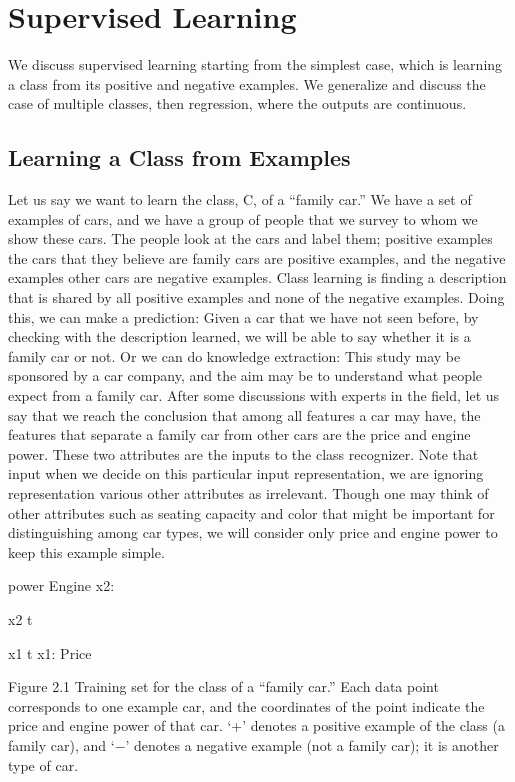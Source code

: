 \chapter{Supervised Learning}
\label{chap:02-supervised-learning}

We discuss supervised learning starting from the simplest case, which is learning a class from its positive and negative examples. We generalize and discuss the case of multiple classes, then regression, where the outputs are continuous.

\section{Learning a Class from Examples}

Let us say we want to learn the class, C, of a “family car.” We have a set of examples of cars, and we have a group of people that we survey to whom we show these cars. The people look at the cars and label them; positive examples the cars that they believe are family cars are positive examples, and the negative examples other cars are negative examples. Class learning is finding a description that is shared by all positive examples and none of the negative examples. Doing this, we can make a prediction: Given a car that we have not seen before, by checking with the description learned, we will be able to say whether it is a family car or not. Or we can do knowledge extraction: This study may be sponsored by a car company, and the aim may be to understand what people expect from a family car. After some discussions with experts in the field, let us say that we reach the conclusion that among all features a car may have, the features that separate a family car from other cars are the price and engine power. These two attributes are the inputs to the class recognizer. Note that input when we decide on this particular input representation, we are ignoring representation various other attributes as irrelevant. Though one may think of other attributes such as seating capacity and color that might be important for distinguishing among car types, we will consider only price and engine power to keep this example simple.

power Engine x2:

x2 t

x1 t x1: Price

Figure 2.1 Training set for the class of a “family car.” Each data point corresponds to one example car, and the coordinates of the point indicate the price and engine power of that car. ‘+’ denotes a positive example of the class (a family car), and ‘$-$’ denotes a negative example (not a family car); it is another type of car.

